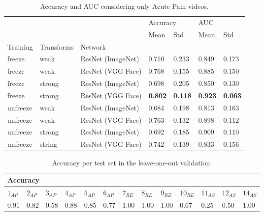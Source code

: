 \begin{table}[h!tp]
\centering
\caption{Accuracy and AUC considering only Acute Pain videos.}
\label{tab:accuracy_auc_ap}
\begin{tabular}{lllllll}
\toprule
         &        &          & \multicolumn{2}{l}{Accuracy} & \multicolumn{2}{l}{AUC} \\
         &        &          &      Mean &       Std &      Mean &       Std \\
Training & Transforms & Network &           &           &           &           \\
\midrule
freeze   & weak   & ResNet (ImageNet) &  0.710 &  0.233 &  0.849 &  0.173 \\
freeze   & weak   & ResNet (VGG Face) &  0.768 &  0.155 &  0.885 &  0.150 \\
freeze   & strong & ResNet (ImageNet) &  0.698 &  0.205 &  0.850 &  0.130 \\
freeze   & strong & ResNet (VGG Face) &  \textbf{0.802} & \textbf{ 0.118} &  \textbf{0.923} &  \textbf{0.063} \\
unfreeze & weak   & ResNet (ImageNet) &  0.684 &  0.198 &  0.813 &  0.163 \\
unfreeze & weak   & ResNet (VGG Face) &  0.763 &  0.132 &  0.898 &  0.112 \\
unfreeze & strong & ResNet (ImageNet) &  0.692 &  0.185 &  0.909 &  0.110 \\
unfreeze & string & ResNet (VGG Face) &  0.742 &  0.139 &  0.833 &  0.156 \\
\bottomrule
\end{tabular}
\end{table}

\begin{table}[h!tp]
\centering
\caption{Accuracy per test set in the leave-one-out validation.}
\label{tab:accuracy_leave_one_out}
\begin{tabular}{lllllllllllll}
\hline
\multicolumn{13}{l}{Accuracy}        \\ \hline
\multicolumn{1}{l|}{$1_{AP}$}  & \multicolumn{1}{l|}{$2_{AP}$}  & \multicolumn{1}{l|}{$3_{AP}$}  & \multicolumn{1}{l|}{$4_{AP}$}  & \multicolumn{1}{l|}{$5_{AP}$}  & \multicolumn{1}{l|}{$6_{AP}$}  & \multicolumn{1}{l|}{$7_{RE}$}  & \multicolumn{1}{l|}{$8_{RE}$}  & \multicolumn{1}{l|}{$9_{RE}$}  & \multicolumn{1}{l|}{$10_{RE}$} & \multicolumn{1}{l|}{$11_{AS}$} & \multicolumn{1}{l|}{$12_{AS}$} & $14_{AS}$ \\ \hline
\multicolumn{1}{l|}{0.91} & \multicolumn{1}{l|}{0.82} & \multicolumn{1}{l|}{0.58} & \multicolumn{1}{l|}{0.88} & \multicolumn{1}{l|}{0.85} & \multicolumn{1}{l|}{0.77} & \multicolumn{1}{l|}{1.00} & \multicolumn{1}{l|}{1.00} & \multicolumn{1}{l|}{1.00} & \multicolumn{1}{l|}{0.67} & \multicolumn{1}{l|}{0.25} & \multicolumn{1}{l|}{0.50} & 1.00 \\ \hline
\end{tabular}
\end{table}

